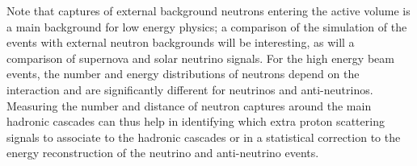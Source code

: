Note that captures of external background neutrons entering the active volume is a main background for low energy physics;  a comparison of the simulation of the  events with external neutron backgrounds will be interesting, as will a comparison of supernova and solar neutrino signals.  For the high energy beam events, the number and energy distributions of neutrons depend on the interaction and are significantly different for neutrinos and anti-neutrinos. Measuring the number and distance of neutron captures around the main hadronic cascades can thus help in identifying which extra proton scattering signals to associate to the hadronic cascades or in a statistical correction to the energy reconstruction of the neutrino and anti-neutrino events. 



